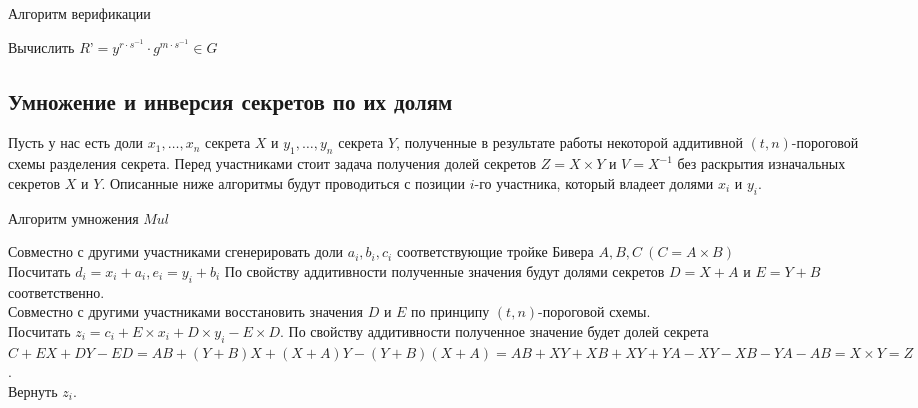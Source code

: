 \documentclass[a4paper,12pt]{article}
\theoremstyle{definition}
\begin{document}
		\begin{algorithm}[H]
			\caption{Алгоритм верификации}
			\label{alg:EGverify}
			\SetAlgoNoEnd \SetAlgoNoLine 
			
			
			Вычислить $R’= y^{r\cdot s^{-1}} \cdot g^{m\cdot s^{-1}} \in G$
			\\ 
						
		\end{algorithm}		
		
		
		\subsection{Умножение и инверсия секретов по их долям} \label{applic:MultInv}
		
		Пусть у нас есть доли $x_1, \dots, x_n$ секрета $X$ и $y_1, \dots, y_n$ секрета $Y$, полученные в результате работы некоторой аддитивной $(t, n)$-пороговой схемы разделения секрета. Перед участниками стоит задача получения долей секретов $Z=X\times Y$ и $V=X^{-1}$ без раскрытия изначальных секретов $X$ и $Y$. Описанные ниже алгоритмы будут проводиться с позиции $i$-го участника, который владеет долями $x_i$ и $y_i$.
		
		\begin{algorithm}
			\caption{Алгоритм умножения $Mul$}
			\label{alg:Tmult}
			
			
			Совместно с другими участниками сгенерировать доли $a_i, b_i, c_i$ соответствующие тройке Бивера $A, B, C\ (C=A\times B)$
			\\Посчитать $d_i = x_i + a_i, e_i = y_i + b_i$ \linebreak
			По свойству аддитивности полученные значения будут долями секретов $D=X+A$ и $E=Y+B$ соответственно.
			\\Совместно с другими участниками восстановить значения $D$ и $E$ по принципу $(t, n)$-пороговой схемы.
			\\Посчитать $z_i = c_i + E\times x_i + D\times y_i - E\times D$. \linebreak
			По свойству аддитивности полученное значение будет долей секрета \linebreak 
			$C + E X + D Y - E D = A B + (Y+B) X + (X+A) Y - (Y+B) (X+A) = A B + X Y + X B + X Y + Y A - X Y - X B - Y A - A B = X\times Y = Z$.
			\\Вернуть $z_i$.
			
			
		\end{algorithm}	
		
\end{document}
